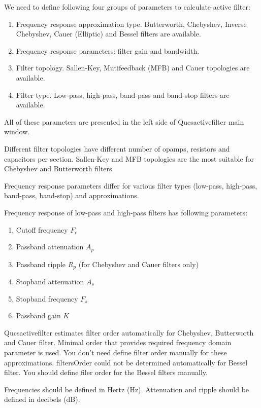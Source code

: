
We need to define following four groups of parameters to calculate active
filter:

\begin{enumerate}
 \item Frequency response approximation type. Butterworth, Chebyshev,
Inverse Chebyshev,  Cauer (Elliptic) and Bessel filters are available.
 \item Frequency response parameters: filter gain and bandwidth.
 \item Filter topology. Sallen-Key, Mutifeedback (MFB) and Cauer topologies are
available.
 \item Filter type. Low-pass, high-pass, band-pass and band-stop filters are
available.
\end{enumerate}

All of these parameters are presented in the left side of Qucsactivefilter main
window.

Different filter topologies have different number of opamps, resistors and
capacitors per section. Sallen-Key and MFB topologies are the most suitable for
Chebyshev and Butterworth filters.

Frequency response parameters differ for various filter types (low-pass,
high-pass, band-pass, band-stop) and approximations.


Frequency response of low-pass and high-pass filters has following
parameters:

\begin{enumerate}
 \item Cutoff frequency $F_c$
 \item Passband attenuation $A_p$
 \item Passband ripple $R_p$ (for Chebyshev and Cauer filters only)
 \item Stopband attenuation $A_s$
 \item Stopband frequency $F_s$
 \item Passband gain $K$
\end{enumerate}

Qucsactivefilter estimates filter order automatically for Chebyshev,
Butterworth and Cauer filter. Minimal order that provides required frequency
domain parameter is used. You don't need define filter order manually for these
approximations. filtersOrder could not be determined automatically for Bessel
filter. You should
define filer order for the Bessel filters manually.

Frequencies should be defined in Hertz (Hz). Attenuation and ripple should
be defined in decibels (dB).

